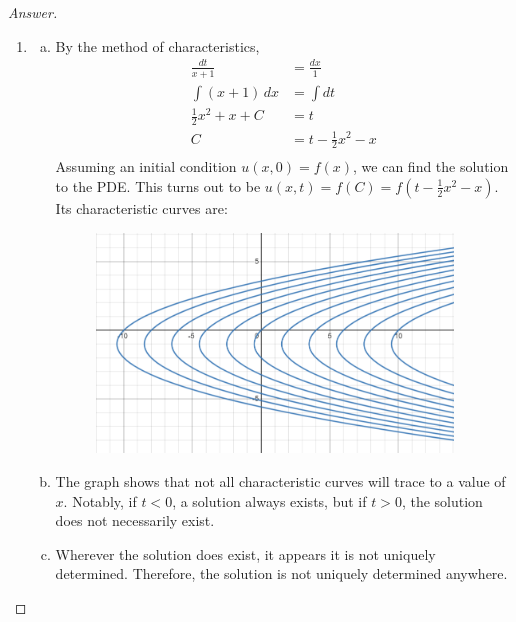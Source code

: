 \documentclass{article}
\theoremstyle{definition}
\renewcommand\qedsymbol{$\blacksquare$}
\newenvironment{ans}{\begin{proof}[Answer]\renewcommand{\qedsymbol}{}}{\end{proof}}
\begin{document}
\begin{ans}
\begin{enumerate}[(1), series=answers]
			\item \begin{enumerate}[a)]
                    \item By the method of characteristics,
                    \begin{align*}
                        \frac{dt}{x+1} &= \frac{dx}{1}\\
                        \int (x+1)\,dx &= \int dt\\
                        \frac{1}{2}x^2 + x + C &= t\\
                        C &= t -\frac{1}{2}x^2 - x\\
                    \end{align*}
                    Assuming an initial condition $u(x, 0) = f(x)$, we can find the solution to the PDE. This turns out to be $\boxed{u(x,t) = f(C) = f\left(t - \frac{1}{2}x^2 - x\right)}$. Its characteristic curves are:
                    \begin{figure}[H]
                        \centering
                        \includegraphics[height=2.3in]{10 graph.png}
                    \end{figure}
                    
                    \item The graph shows that not all characteristic curves will trace to a value of $x$. Notably, if $t < 0$, a solution always exists, but if $t > 0$, the solution does not necessarily exist.

                    \item Wherever the solution does exist, it appears it is not uniquely determined. Therefore, the solution is not uniquely determined anywhere.


\end{enumerate}
\end{enumerate}
\end{ans}
\end{document}
